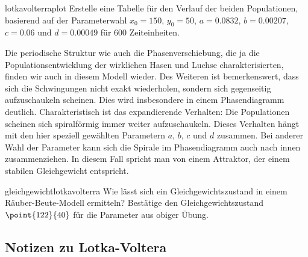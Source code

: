 \documentclass[%
<<<<<<< Updated upstream
11pt,%
twoside,%
titlepage,%
german,%
headsepline%
]{scrartcl}
\begin{document}
\begin{uebenv}{lotkavolterraplot}
Erstelle eine Tabelle für den Verlauf der beiden Populationen, basierend auf der Parameterwahl $x_0=150$, $y_0=50$, $a=0.0832$, $b=0.00207$, $c=0.06$ und $d=0.00049$ für $600$ Zeiteinheiten.
\end{uebenv}

Die periodische Struktur wie auch die Phasenverschiebung, die ja die Populationsentwicklung der wirklichen Hasen und Luchse charakterisierten, finden wir auch in diesem Modell wieder. Des Weiteren ist bemerkenswert, dass sich die Schwingungen nicht exakt wiederholen, sondern sich gegenseitig aufzuschaukeln scheinen. Dies wird insbesondere in einem Phasendiagramm deutlich. Charakteristisch ist das expandierende Verhalten: Die Populationen scheinen sich spiralförmig immer weiter aufzuschaukeln. Dieses Verhalten hängt mit den hier speziell gewählten Parametern $a$, $b$, $c$ und $d$ zusammen. Bei anderer Wahl der Parameter kann sich die Spirale im Phasendiagramm auch nach innen zusammenziehen. In diesem Fall spricht man von einem Attraktor, der einem stabilen Gleichgewicht entspricht.

\begin{uebenv}{gleichgewichtlotkavolterra}
Wie lässt sich ein Gleichgewichtszustand in einem Räuber-Beute-Modell ermitteln? Bestätige den Gleichgewichtszustand $\point{122}{40}$ für die Parameter aus obiger Übung.
\end{uebenv}

\clearpage

\subsection{Notizen zu Lotka-Voltera}
\end{document}

